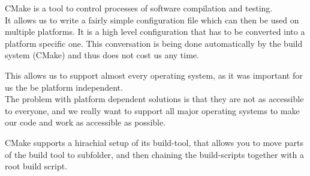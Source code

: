 CMake is a tool to control processes of software compilation and testing. \cite{cmake} \\
It allows us to write a fairly simple configuration file which can then be used on multiple platforms.
It is a high level configuration that has to be converted into a platform specific one. This conversation is being done automatically by the build system (CMake) and thus does not cost us any time.

This allows us to support almost every operating system, as it was important for us the be platform independent. \\

The problem with platform dependent solutions is that they are not as accessible to everyone, and we really want to support all major operating systems to make our code and work as accessible as possible.

CMake supports a hirachial setup of its build-tool, that allows you to move parts of the build tool to subfolder, and then chaining the build-scripts together with a root build script.\cite{cmake}